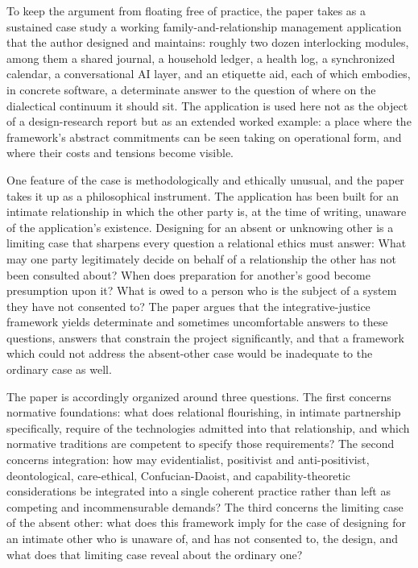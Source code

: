 To keep the argument from floating free of practice, the paper takes as a sustained case study a working family-and-relationship management application that the author designed and maintains: roughly two dozen interlocking modules, among them a shared journal, a household ledger, a health log, a synchronized calendar, a conversational AI layer, and an etiquette aid, each of which embodies, in concrete software, a determinate answer to the question of where on the dialectical continuum it should sit. The application is used here not as the object of a design-research report but as an extended worked example: a place where the framework's abstract commitments can be seen taking on operational form, and where their costs and tensions become visible.

One feature of the case is methodologically and ethically unusual, and the paper takes it up as a philosophical instrument. The application has been built for an intimate relationship in which the other party is, at the time of writing, unaware of the application's existence. Designing for an absent or unknowing other is a limiting case that sharpens every question a relational ethics must answer: What may one party legitimately decide on behalf of a relationship the other has not been consulted about? When does preparation for another's good become presumption upon it? What is owed to a person who is the subject of a system they have not consented to? The paper argues that the integrative-justice framework yields determinate and sometimes uncomfortable answers to these questions, answers that constrain the project significantly, and that a framework which could not address the absent-other case would be inadequate to the ordinary case as well.

The paper is accordingly organized around three questions. The first concerns normative foundations: what does relational flourishing, in intimate partnership specifically, require of the technologies admitted into that relationship, and which normative traditions are competent to specify those requirements? The second concerns integration: how may evidentialist, positivist and anti-positivist, deontological, care-ethical, Confucian-Daoist, and capability-theoretic considerations be integrated into a single coherent practice rather than left as competing and incommensurable demands? The third concerns the limiting case of the absent other: what does this framework imply for the case of designing for an intimate other who is unaware of, and has not consented to, the design, and what does that limiting case reveal about the ordinary one?

